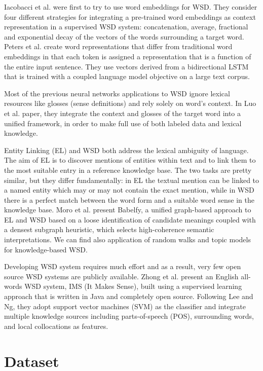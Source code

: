 \documentclass{llncs}
\begin{document}
Iacobacci et al.\cite{embeddingsforWSD} were first to try to use word embeddings for WSD. They consider four different strategies for integrating a pre-trained word embeddings as context representation in a supervised WSD system: concatenation, average, fractional and exponential decay of the vectors of the words surrounding a target word.
Peters et al.\cite{deepcontext} create word representations that differ from traditional word embeddings in that each token is assigned a representation that is a function of the entire input sentence. They use vectors derived from a bidirectional LSTM that is trained with a coupled language model objective on a large text corpus.

Most of the previous neural networks applications to WSD ignore lexical resources like glosses (sense definitions) and rely solely on word's context. In Luo et al.\cite{glosses} paper, they integrate the context and glosses of the target word into a unified framework, in order to make full use of both labeled data and lexical knowledge.

Entity Linking (EL) and WSD both address the lexical ambiguity of language. The aim of EL is to discover mentions of entities within text and to link them to the most suitable entry in a reference knowledge base. The two tasks are pretty similar, but they differ fundamentally: in EL the textual mention can be linked to a named entity which may or may not contain the exact mention, while in WSD there is a perfect match between the word form and a suitable word sense in the knowledge base.
Moro et al.\cite{babelfy} present Babelfy, a unified graph-based approach to EL and WSD based on a loose identification of candidate meanings coupled with a densest subgraph heuristic, which selects high-coherence semantic interpretations.
We can find also application of random walks\cite{randomwalks} and topic models\cite{topicmodels} for knowledge-based WSD.

Developing WSD system requires much effort and as a result, very few open source WSD systems are publicly available. Zhong et al.\cite{itmakessense} present an English all-words WSD system, IMS (It Makes Sense), built using a supervised learning approach that is written in Java and completely open source. Following Lee and Ng\cite{SVMtoWSD}, they adopt support vector machines (SVM) as the classifier and integrate multiple knowledge sources including parts-of-speech (POS), surrounding words, and local collocations as features.

\section{Dataset}
\label{sec:dataset}
\end{document}

